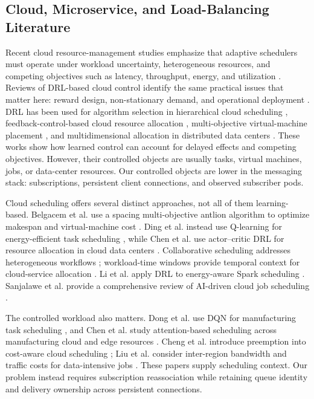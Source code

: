 \documentclass[manuscript]{acmart}
\begin{document}
\subsection{Cloud, Microservice, and Load-Balancing Literature}

Recent cloud resource-management studies emphasize that adaptive schedulers
must operate under workload uncertainty, heterogeneous resources, and competing
objectives such as latency, throughput, energy, and utilization
\cite{Khan2022MLCloudReview}. Reviews of DRL-based cloud control identify the
same practical issues that matter here: reward design, non-stationary demand,
and operational deployment \cite{Zhou2024DRLCloudReview}. DRL has been used
for algorithm selection in hierarchical cloud scheduling
\cite{Zhou2022DRLSelector}, feedback-control-based cloud resource allocation
\cite{Chen2022RLFeedback}, multi-objective virtual-machine placement
\cite{Caviglione2021VMPlacement}, and multidimensional allocation in
distributed data centers \cite{Wei2023TNSM}. These works show how learned
control can account for delayed effects and competing objectives.
However, their controlled objects are usually tasks, virtual machines, jobs, or
data-center resources. Our controlled objects are lower in the messaging
stack: subscriptions, persistent client connections, and observed subscriber
pods.

Cloud scheduling offers several distinct approaches, not all of them
learning-based. Belgacem et al. use a spacing multi-objective antlion algorithm
to optimize makespan and virtual-machine cost \cite{Belgacem2020DynamicResource}.
Ding et al. instead use Q-learning for energy-efficient task scheduling
\cite{Ding2020QLearningCloud}, while Chen et al. use actor--critic DRL for
resource allocation in cloud data centers \cite{Chen2022ActorCritic}.
Collaborative scheduling addresses heterogeneous workflows
\cite{Chen2023CollaborativeScheduling}; workload-time windows provide temporal
context for cloud-service allocation \cite{Chen2023WorkloadWindows}.
Li et al. apply DRL to energy-aware Spark scheduling \cite{Li2023SparkDRL}.
Sanjalawe et al. provide a comprehensive review of AI-driven cloud job
scheduling \cite{Sanjalawe2025AIJobScheduling}.

The controlled workload also matters. Dong et al. use DQN for manufacturing
task scheduling \cite{Dong2020CloudManufacturing}, and Chen et al. study
attention-based scheduling across manufacturing cloud and edge resources
\cite{Chen2023CloudEdgeManufacturing}. Cheng et al. introduce preemption into
cost-aware cloud scheduling \cite{Cheng2023PreemptiveCloud}; Liu et al. consider
inter-region bandwidth and traffic costs for data-intensive jobs
\cite{Liu2026GeoDRL}. These papers supply scheduling context. Our problem
instead requires subscription reassociation while retaining queue identity
and delivery ownership across persistent connections.
\end{document}
